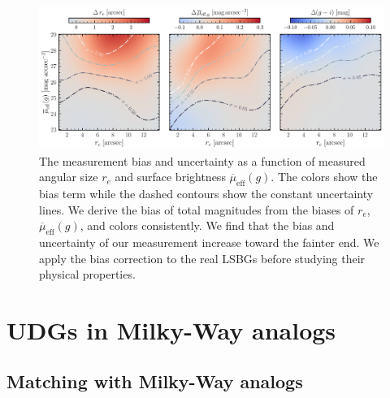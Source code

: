 \documentclass[twocolumn,astrosymb,twocolappendix]{aastex631}
\newcommand{\sbeff}{\overline{\mu}_{\mathrm{eff}}(g)}
\begin{document}
\begin{CJK*}{UTF8}{gbsn}

\begin{figure}
	\vbox{ 
		\centering
		\includegraphics[width=1\linewidth]{meas_error_spergel.pdf}
	}
    \caption{The measurement bias and uncertainty as a function of measured angular size $r_e$ and surface brightness $\sbeff$. The colors show the bias term while the dashed contours show the constant uncertainty lines. We derive the bias of total magnitudes from the biases of $r_e$, $\sbeff$, and colors consistently. We find that the bias and uncertainty of our measurement increase toward the fainter end. We apply the bias correction to the real LSBGs before studying their physical properties.}
    \label{fig:meas_err}
\end{figure}

\section{UDGs in Milky-Way analogs}

\subsection{Matching with Milky-Way analogs}\label{sec:match}


\end{CJK*}
\end{document}
